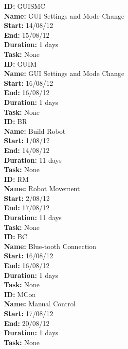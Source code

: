 \documentclass[11pt, a4paper]{report}
\begin{document}
\noindent \textbf{ID:} GUISMC \\
\noindent \textbf{Name:} GUI Settings and Mode Change \\
\noindent \textbf{Start:} 14/08/12 \\
\noindent \textbf{End:} 15/08/12 \\
\noindent \textbf{Duration:} 1 days \\
\noindent \textbf{Task:} None\\[0.5cm]

\noindent \textbf{ID:} GUIM \\
\noindent \textbf{Name:} GUI Settings and Mode Change \\
\noindent \textbf{Start:} 16/08/12 \\
\noindent \textbf{End:} 16/08/12 \\
\noindent \textbf{Duration:} 1 days \\
\noindent \textbf{Task:} None\\[0.5cm]

\noindent \textbf{ID:} BR \\
\noindent \textbf{Name:} Build Robot \\
\noindent \textbf{Start:} 1/08/12 \\
\noindent \textbf{End:} 14/08/12 \\
\noindent \textbf{Duration:} 11 days \\
\noindent \textbf{Task:} None\\[0.5cm]

\noindent \textbf{ID:} RM \\
\noindent \textbf{Name:} Robot Movement \\
\noindent \textbf{Start:} 2/08/12 \\
\noindent \textbf{End:} 17/08/12 \\
\noindent \textbf{Duration:} 11 days \\
\noindent \textbf{Task:} None\\[0.5cm]

\noindent \textbf{ID:} BC \\
\noindent \textbf{Name:} Blue-tooth Connection \\
\noindent \textbf{Start:} 16/08/12 \\
\noindent \textbf{End:} 16/08/12 \\
\noindent \textbf{Duration:} 1 days \\
\noindent \textbf{Task:} None\\[0.5cm]

\noindent \textbf{ID:} MCon \\
\noindent \textbf{Name:} Manual Control \\
\noindent \textbf{Start:} 17/08/12 \\
\noindent \textbf{End:} 20/08/12 \\
\noindent \textbf{Duration:} 1 days \\
\noindent \textbf{Task:} None\\[0.5cm]
\end{document}

